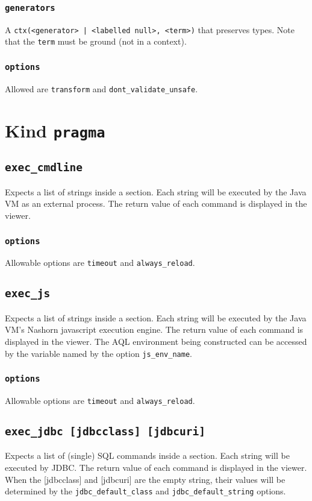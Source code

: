 \documentclass[10pt]{book}
\begin{document}
\subsection{{\tt generators}}
A {\tt ctx(<generator> | <labelled null>, <term>)} that preserves types.  Note that the {\tt term} must be ground (not in a context).  

\subsection{{\tt options}}
Allowed are {\tt transform} and {\tt dont\_validate\_unsafe}.

\chapter{Kind {\tt pragma}}
\section{{\tt exec\_cmdline}}
Expects a list of strings inside a section.  Each string will be executed by the Java VM as an external process.  The return value of each command is displayed in the viewer.

\subsection{{\tt options}}

Allowable options are {\tt timeout} and {\tt always\_reload}.

\section{{\tt exec\_js}} 
Expects a list of strings inside a section.  Each string will be executed by the Java VM's Nashorn javascript execution engine.  The return value of each command is displayed in the viewer.  The AQL environment being constructed can be accessed by the variable named by the option {\tt js\_env\_name}.

\subsection{{\tt options}}

Allowable options are {\tt timeout} and {\tt always\_reload}.

\section{{\tt exec\_jdbc [jdbcclass] [jdbcuri]}}
Expects a list of (single) SQL commands inside a section.  Each string will be executed by JDBC.  The return value of each command is displayed in the viewer.  When the [jdbcclass] and [jdbcuri] are the empty string, their values will be determined by the {\tt jdbc\_default\_class} and {\tt jdbc\_default\_string} options.
\end{document}
